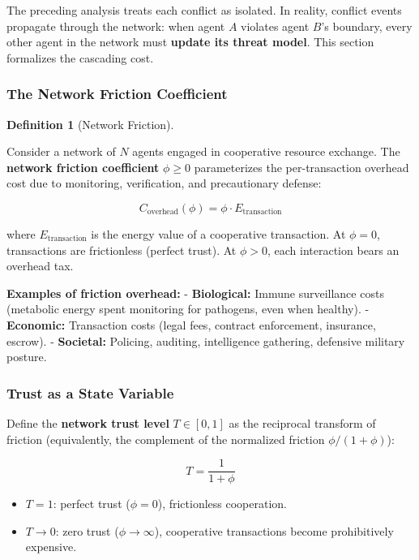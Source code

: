 \documentclass[11pt]{article}
\theoremstyle{plain}
\theoremstyle{definition}
\newtheorem{definition}{Definition}
\theoremstyle{remark}
\let\origsubsubsection\subsubsection
\renewcommand{\subsubsection}{\needspace{4\baselineskip}\origsubsubsection}
\providecommand{\tightlist}{%
  \setlength{\itemsep}{0pt}\setlength{\parskip}{0pt}}
\begin{document}
The preceding analysis treats each conflict as isolated. In reality,
conflict events propagate through the network: when agent \(A\) violates
agent \(B\)'s boundary, every other agent in the network must
\textbf{update its threat model}. This section formalizes the cascading
cost.

\subsubsection{The Network Friction
Coefficient}\label{the-network-friction-coefficient}

\begin{definition}[Network Friction]
\label{def-network-friction}

Consider a network of $N$ agents engaged in cooperative resource exchange. The \textbf{network friction coefficient} $\phi \geq 0$ parameterizes the per-transaction overhead cost due to monitoring, verification, and precautionary defense:

$$C_{\text{overhead}}(\phi) = \phi \cdot E_{\text{transaction}}$$

where $E_{\text{transaction}}$ is the energy value of a cooperative transaction. At $\phi = 0$, transactions are frictionless (perfect trust). At $\phi > 0$, each interaction bears an overhead tax.
\end{definition}

\textbf{Examples of friction overhead:} - \textbf{Biological:} Immune
surveillance costs (metabolic energy spent monitoring for pathogens,
even when healthy). - \textbf{Economic:} Transaction costs (legal fees,
contract enforcement, insurance, escrow). - \textbf{Societal:} Policing,
auditing, intelligence gathering, defensive military posture.

\subsubsection{Trust as a State
Variable}\label{trust-as-a-state-variable}

Define the \textbf{network trust level} \(T \in [0, 1]\) as the
reciprocal transform of friction (equivalently, the complement of the
normalized friction \(\phi/(1+\phi)\)):

\[T = \frac{1}{1 + \phi}\]

\begin{itemize}
\tightlist
\item
  \(T = 1\): perfect trust (\(\phi = 0\)), frictionless cooperation.
\item
  \(T \to 0\): zero trust (\(\phi \to \infty\)), cooperative
  transactions become prohibitively expensive.
\end{itemize}
\end{document}
